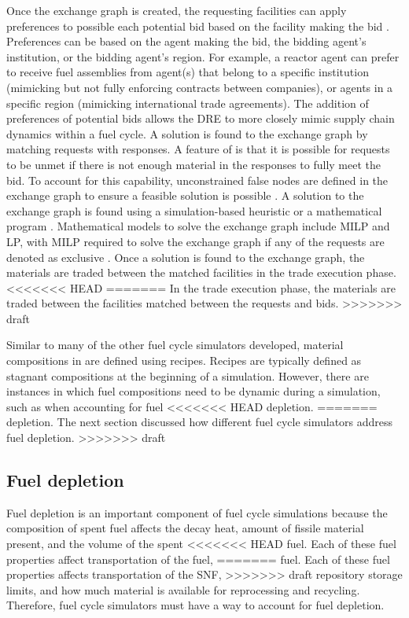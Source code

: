 Once the exchange graph is created, the requesting facilities can apply 
preferences to possible each potential bid based on the facility 
making the bid \cite{huff_fundamental_2016}. Preferences can be based on 
the agent making the bid, the bidding agent's institution, or 
the bidding agent's 
region. For example, a reactor agent can prefer to receive fuel 
assemblies from agent(s) that belong to a specific institution (mimicking but not 
fully enforcing contracts between companies), or agents in a specific region 
(mimicking international trade agreements). The addition of preferences of 
potential bids allows the \gls{DRE} to more closely mimic supply chain 
dynamics within a fuel cycle. 
A solution is found to the exchange graph by matching requests with 
responses. A feature of \Cyclus is that it is possible for 
requests to be unmet if there is not enough material in the responses 
to fully meet the bid. To account for this 
capability, unconstrained false nodes are defined in the exchange graph
to ensure a feasible solution is possible \cite{gidden_methodology_2016}.
A solution to the exchange graph is found using a simulation-based 
heuristic or a mathematical program \cite{gidden_agent-based_2015}.
Mathematical models to solve the exchange graph include \gls{MILP} and 
\gls{LP}, with \gls{MILP} required to solve the exchange graph if 
any of the requests are denoted as exclusive \cite{huff_fundamental_2016}.
Once a solution is found to the exchange graph, the materials are 
traded between the matched facilities in the trade execution phase.  
<<<<<<< HEAD
=======
In the trade execution phase, the materials are traded between the 
facilities matched between the requests and bids. 
>>>>>>> draft

Similar to many of the other fuel cycle simulators developed, material 
compositions in \Cyclus are defined using recipes. Recipes are 
typically defined as stagnant compositions at the beginning of 
a simulation. However, there are instances in which fuel compositions 
need to be dynamic during a simulation, such as when accounting for fuel 
<<<<<<< HEAD
depletion. 
=======
depletion. The next section discussed how different fuel 
cycle simulators address fuel depletion. 
>>>>>>> draft

\subsection{Fuel depletion}
Fuel depletion is an important component of fuel cycle simulations 
because the composition of spent fuel affects the decay heat, 
amount of fissile material present, and the volume of the spent 
<<<<<<< HEAD
fuel. Each of these fuel properties affect transportation of the fuel, 
=======
fuel. Each of these fuel properties affects transportation of the 
\gls{SNF}, 
>>>>>>> draft
repository storage limits, and how much material is available for 
reprocessing and recycling. Therefore, fuel cycle simulators must 
have a way to account for fuel depletion. 

